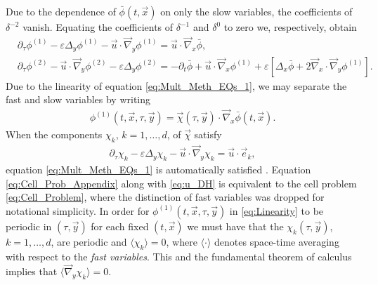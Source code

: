 \documentclass[11pt]{amsart}
\begin{document}
Due to the dependence of $\bar{\phi}(t,\vec{x})$ on only the
slow variables, the coefficients of $\delta^{-2}$ vanish. Equating the
coefficients of $\delta^{-1}$ and $\delta^0$ to zero we, respectively, obtain 
%
\begin{align}
  \label{eq:Mult_Meth_EQs_1}
  &\partial_\tau\phi^{(1)}-\varepsilon\Delta_y\phi^{(1)}-\vec{u}\cdot\vec{\nabla}_y\phi^{(1)}=\vec{u}\cdot\vec{\nabla}_x\bar{\phi},
  \\
  \label{eq:Mult_Meth_EQs_2}
  &\partial_\tau\phi^{(2)}-\vec{u}\cdot\vec{\nabla}_y\phi^{(2)}-\varepsilon\Delta_y\phi^{(2)}
  =-\partial_t\bar{\phi}+\vec{u}\cdot\vec{\nabla}_x\phi^{(1)}+\varepsilon[\Delta_x\bar{\phi}+2\vec{\nabla}_x\cdot\vec{\nabla}_y\phi^{(1)}].
\end{align}
%
Due to the linearity of equation \eqref{eq:Mult_Meth_EQs_1}, we may
separate the fast and slow variables by writing
\cite{McLaughlin:SIAM_JAM:780}
%
\begin{align}\label{eq:Linearity}
  \phi^{(1)}(t,\vec{x},\tau,\vec{y})
    =%
    \vec{\chi}(\tau,\vec{y})\cdot\vec{\nabla}_x\bar{\phi}(t,\vec{x}).
\end{align}
%
When
the components $\chi_k$, $k=1,\ldots,d$, of $\vec{\chi}$ satisfy   
%
\begin{align}\label{eq:Cell_Prob_Appendix}
  \partial_\tau\chi_k-\varepsilon\Delta_y\chi_k-\vec{u}\cdot\vec{\nabla}_y\chi_k=\vec{u}\cdot\vec{e}_k,
\end{align}
%
equation \eqref{eq:Mult_Meth_EQs_1} is automatically satisfied
\cite{McLaughlin:SIAM_JAM:780}. Equation \eqref{eq:Cell_Prob_Appendix}
along with \eqref{eq:u_DH} is equivalent to the cell problem
\eqref{eq:Cell_Problem}, where the distinction of fast variables was
dropped for notational simplicity. In order for
$\phi^{(1)}(t,\vec{x},\tau,\vec{y})$ in \eqref{eq:Linearity} to be periodic  
in $(\tau,\vec{y})$ for each fixed $(t,\vec{x})$ we must have that the
$\chi_k(\tau,\vec{y})$, $k=1,\ldots,d$, are periodic and $\langle\chi_k\rangle=0$, where $\langle\cdot\rangle$ denotes
space-time averaging with respect to the \emph{fast variables}. This
and the fundamental theorem of calculus implies that $\langle\vec{\nabla}_y\chi_k\rangle=0$.
\end{document}
